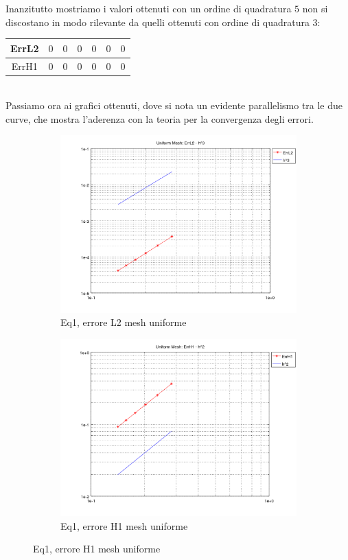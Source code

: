 \documentclass[12pt,a4paper]{report}
\theoremstyle{theorem}
\theoremstyle{theorem}
\theoremstyle{definition}
\begin{document}
Inanzitutto mostriamo i valori ottenuti con un ordine di quadratura $5$ non si discostano in modo rilevante da quelli ottenuti con ordine di quadratura $3$:
\begin{table}[!h]
\centering
\begin{tabular}{ | c | c | c | c | c | c | c | }
\hline
ErrL2	&	$0$ & $0$ & $0$ & $0$  & $0$ & $0$ \\ \hline 
ErrH1	&	$0$ &	$0$	 & $0$	 & $0$ & $0$ & $0$ \\ \hline 
\end{tabular}
\end{table}
\hfill \\
Passiamo ora ai grafici ottenuti, dove si nota un evidente parallelismo tra le due curve, che mostra l'aderenza con la teoria per la convergenza degli errori.

\begin{figure}[!h]
	\centering
	\begin{subfigure}[b]{0.49\textwidth}
    		\includegraphics[width=\textwidth]{Eq1-L2U.png}
    		\caption{Eq1, errore L2 mesh uniforme}
    	\end{subfigure}
    	\begin{subfigure}[b]{0.49\textwidth}
    		\includegraphics[width=\textwidth]{Eq1-H1U.png}
    		\caption{Eq1, errore H1 mesh uniforme}
    	\end{subfigure}
\end{figure}
\end{document}
